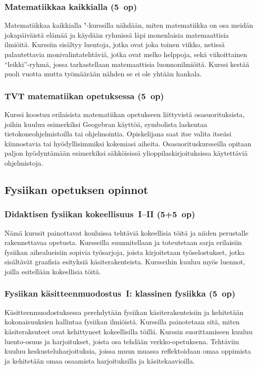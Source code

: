 \documentclass[../ala_hataile.tex]{subfiles}
\begin{document}
\subsubsection*{Matematiikkaa kaikkialla (5~op)}
Matematiikkaa kaikkialla "-kurssilla nähdään, miten matematiikka on osa meidän jokapäiväistä elämää ja käydään ryhmissä läpi monenlaisia matemaattisia ilmiöitä.	Kurssiin sisältyy luentoja, jotka ovat joka toinen viikko, netissä palautettavia monivalintatehtäviä, jotka ovat melko helppoja, sekä viikoittainen ``leikki''-ryhmä, jossa tarkastellaan matemaattisia luonnonilmiöitä. Kurssi kestää puoli vuotta mutta työmäärään nähden se ei ole yhtään hankala.
\subsubsection*{TVT matematiikan opetuksessa (5~op)}
Kurssi koostuu erilaisista matematiikan opetukseen liittyvistä osasuorituksista, joihin kuuluu esimerkiksi Geogebran käyttöä, symbolista laskentaa tietokoneohjelmistoilla tai ohjelmointia. Opiskelijana saat itse valita itseäsi kiinnostavia tai hyödyllisimmiksi kokemiasi aiheita. Osasuorituskursseilla opitaan paljon hyödyntämään esimerkiksi sähköisissä ylioppilaskirjoituksissa käytettäviä ohjelmistoja. 
\subsection*{Fysiikan opetuksen opinnot}
\subsubsection*{Didaktisen fysiikan kokeellisuus~I--II (5+5~op)}
Nämä kurssit painottavat kouluissa tehtäviä kokeellisia töitä ja niiden perustalle rakennettavaa opetusta. Kursseilla suunnitellaan ja toteutetaan sarja erilaisiin fysiikan aihealueisiin sopivia työsarjoja, joista kirjoitetaan työselostukset, jotka sisältävät graafisia esityksiä käsiterakenteista. Kursseihin kuuluu myös luennot, joilla esitellään kokeellisia töitä. 
\subsubsection*{Fysiikan käsitteenmuodostus~I: klassinen fysiikka (5~op)}
Käsitteenmuodostuksessa perehdytään fysiikan käsiterakenteisiin ja kehitetään kokonaisuuksien hallintaa fysiikan ilmiöistä. Kurssilla painotetaan sitä, miten käsiterakenteet ovat kehittyneet kokeellisilla töillä. Kurssin suorittamiseen kuuluu luento-osuus ja harjoitukset, joista osa tehdään verkko-opetuksena. Tehtäviin kuuluu keskusteluharjoituksia, joissa muun muassa reflektoidaan omaa oppimista ja kehitetään omaa osaamista harjoituksilla ja käsitekaavioilla.
\end{document}

